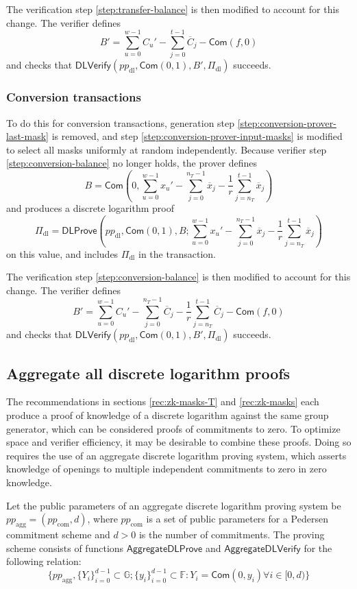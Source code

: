 \documentclass{article}
\newcommand{\G}{\mathbb{G}}
\newcommand{\F}{\mathbb{F}}
\newcommand{\func}[1]{\mathsf{#1}}
\newcommand{\com}{\func{Com}}
\begin{document}
The verification step \ref{step:transfer-balance} is then modified to account for this change.
The verifier defines
$$B' = \sum_{u=0}^{w-1} C_u' - \sum_{j=0}^{t-1} \overline{C}_j - \com(f,0)$$
and checks that $\func{DLVerify}(pp_{\text{dl}}, \com(0,1), B', \Pi_{\text{dl}})$ succeeds.


\subsubsection{Conversion transactions}

To do this for conversion transactions, generation step \ref{step:conversion-prover-last-mask} is removed, and step \ref{step:conversion-prover-input-masks} is modified to select all masks uniformly at random independently.
Because verifier step \ref{step:conversion-balance} no longer holds, the prover defines
$$B = \com\left( 0, \sum_{u=0}^{w-1} x_u' - \sum_{j=0}^{n_T-1} \overline{x}_j - \frac{1}{r} \sum_{j=n_T}^{t-1} \overline{x}_j \right)$$
and produces a discrete logarithm proof
$$\Pi_{\text{dl}} = \func{DLProve}\left( pp_{\text{dl}}, \com(0,1), B ; \sum_{u=0}^{w-1} x_u' - \sum_{j=0}^{n_T-1} \overline{x}_j - \frac{1}{r} \sum_{j=n_T}^{t-1} \overline{x}_j \right)$$
on this value, and includes $\Pi_{\text{dl}}$ in the transaction.

The verification step \ref{step:conversion-balance} is then modified to account for this change.
The verifier defines
$$B' = \sum_{u=0}^{w-1} C_u' - \sum_{j=0}^{n_T-1} \overline{C}_j - \frac{1}{r} \sum_{j=n_T}^{t-1} \overline{C}_j - \com(f,0)$$
and checks that $\func{DLVerify}(pp_{\text{dl}}, \com(0,1), B', \Pi_{\text{dl}})$ succeeds.


\subsection{Aggregate all discrete logarithm proofs}

The recommendations in sections \ref{rec:zk-masks-T} and \ref{rec:zk-masks} each produce a proof of knowledge of a discrete logarithm against the same group generator, which can be considered proofs of commitments to zero.
To optimize space and verifier efficiency, it may be desirable to combine these proofs.
Doing so requires the use of an aggregate discrete logarithm proving system, which asserts knowledge of openings to multiple independent commitments to zero in zero knowledge.

Let the public parameters of an aggregate discrete logarithm proving system be $pp_{\text{agg}} = (pp_{\text{com}},d)$, where $pp_{\text{com}}$ is a set of public parameters for a Pedersen commitment scheme and $d > 0$ is the number of commitments.
The proving scheme consists of functions $\func{AggregateDLProve}$ and $\func{AggregateDLVerify}$ for the following relation:
$$\{pp_{\text{agg}}, \{Y_i\}_{i=0}^{d-1} \subset \G ; \{y_i\}_{i=0}^{d-1} \subset \F : Y_i = \com(0,y_i) \forall i \in [0,d)\}$$
\end{document}
